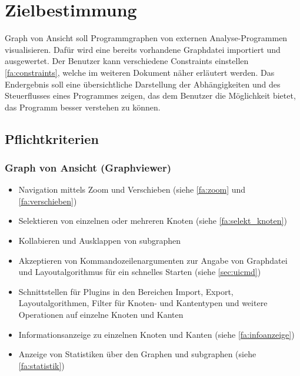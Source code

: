 \chapter{Zielbestimmung}

Graph von Ansicht soll Programmgraphen von externen Analyse-Programmen visualisieren. Dafür wird eine bereits vorhandene Graphdatei importiert und ausgewertet. Der Benutzer kann verschiedene Constraints einstellen \ref{fa:constraints}, welche im weiteren Dokument näher erläutert werden.
Das Endergebnis soll eine übersichtliche Darstellung der Abhängigkeiten und des Steuerflusses eines Programmes zeigen, das dem Benutzer die Möglichkeit bietet, das Programm besser verstehen zu können.

\section{Pflichtkriterien}

\subsection{Graph von Ansicht (Graphviewer)}
  \begin{itemize}
    \item Navigation mittels Zoom und Verschieben (siehe \ref{fa:zoom} und \ref{fa:verschieben})
    \item Selektieren von einzelnen oder mehreren Knoten (siehe \ref{fa:selekt_knoten})
    \item Kollabieren und Ausklappen von \gls{subgraph}en %
    \item Akzeptieren von Kommandozeilenargumenten zur Angabe von Graphdatei und Layoutalgorithmus für ein schnelles Starten (siehe \ref{sec:uicmd})
    \item Schnittstellen für Plugins in den Bereichen Import, Export, Layoutalgorithmen, Filter für Knoten- und Kantentypen und weitere Operationen auf einzelne Knoten und Kanten
    \item Informationsanzeige zu einzelnen Knoten und Kanten (siehe \ref{fa:infoanzeige})
    \item Anzeige von Statistiken über den Graphen und \gls{subgraph}en (siehe \ref{fa:statistik})
  \end{itemize}
  
